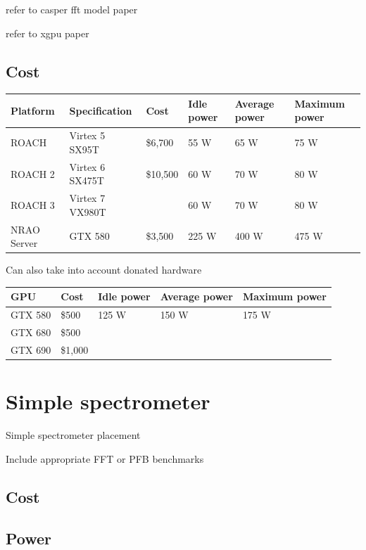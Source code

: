 refer to casper fft model paper

refer to xgpu paper

\subsection{Cost}


\begin{tabular}{| l | l | l | l | l | l |}
\hline  
\textbf{Platform} & Specification & Cost & Idle power & Average power & Maximum power \\
\hline  
ROACH & Virtex 5 SX95T & \$6,700 & 55 W & 65 W & 75 W \\
ROACH 2 & Virtex 6 SX475T & \$10,500 & 60 W & 70 W & 80 W \\
ROACH 3 & Virtex 7 VX980T & & 60 W & 70 W & 80 W \\
NRAO Server & GTX 580 & \$3,500 & 225 W & 400 W & 475 W \\
\hline  
\end{tabular}

Can also take into account donated hardware \\

\begin{tabular}{| l | l | l | l | l |}
\hline  
GPU & Cost & Idle power & Average power & Maximum power \\
\hline  
GTX 580& \$500 & 125 W & 150 W & 175 W \\
GTX 680 & \$500 & & & \\
GTX 690& \$1,000 & & & \\
\hline  
\end{tabular}



\section{Simple spectrometer}
Simple spectrometer placement

Include appropriate FFT or PFB benchmarks
\subsection{Cost}
\subsection{Power}

